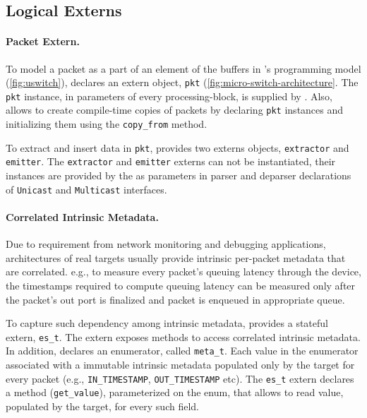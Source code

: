\documentclass[letterpaper,twocolumn,10pt]{article}
\begin{document}
\subsection{Logical Externs}
\label{sec:logical-externs}

\paragraph{Packet Extern.}
To model a packet as a part of an element of the buffers in 
\uswitch's programming model (\cref{fig:uswitch}), \uarch declares an 
extern object, \texttt{pkt} (\cref{fig:micro-switch-architecture}.
The \texttt{pkt} instance, in parameters of every processing-block, 
is 
supplied by \uswitch.
Also, \uswitch allows to create compile-time copies of packets 
by declaring \texttt{pkt} instances and initializing them using the 
\texttt{copy\_from} method. 

To extract and insert data in \texttt{pkt}, \uarch provides two 
externs objects, \texttt{extractor} and \texttt{emitter}.
The \texttt{extractor} and \texttt{emitter} externs can not be 
instantiated, their instances are provided by the \uswitch as 
parameters in parser and deparser declarations of \texttt{Unicast} 
and \texttt{Multicast} interfaces. 

\paragraph{Correlated Intrinsic Metadata.}
Due to requirement from network monitoring and debugging applications,
architectures of real targets usually provide intrinsic per-packet 
metadata that are correlated. e.g., to measure every packet's queuing 
latency through the device, the timestamps required to compute 
queuing latency can be measured only after the packet's out port is 
finalized and packet is enqueued in appropriate queue.

To capture such dependency among intrinsic metadata, \uarch provides 
a stateful extern, \texttt{es\_t}. The extern exposes methods to 
access correlated intrinsic metadata. In addition, \uarch declares an 
enumerator, called \texttt{meta\_t}. Each value in the enumerator 
associated with a immutable intrinsic metadata populated only by the 
target for every packet (e.g., \texttt{IN\_TIMESTAMP}, 
\texttt{OUT\_TIMESTAMP} etc). The \texttt{es\_t} extern declares a 
method (\texttt{get\_value}), parameterized on the enum, that allows 
to read value, populated by the target, for every such field.
\end{document}
